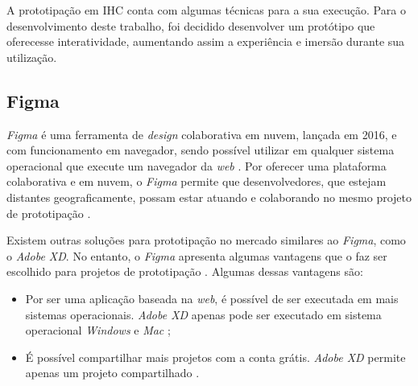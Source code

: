 A prototipação em IHC conta com algumas técnicas para a sua execução. Para o desenvolvimento deste trabalho, foi decidido desenvolver um protótipo que oferecesse interatividade, aumentando assim a experiência e imersão durante sua utilização.

\subsection{Figma}

\textit{Figma} é uma ferramenta de \textit{design} colaborativa em nuvem, lançada em 2016, e com funcionamento em navegador, sendo possível utilizar em qualquer sistema operacional que execute um navegador da \textit{web} \cite{nguyen}. Por oferecer uma plataforma colaborativa e em nuvem, o \textit{Figma} permite que desenvolvedores, que estejam distantes geograficamente, possam estar atuando e colaborando no mesmo projeto de prototipação \cite{nascimento}.

Existem outras soluções para prototipação no mercado similares ao \textit{Figma}, como o \textit{Adobe XD}. No entanto, o \textit{Figma} apresenta algumas vantagens que o faz ser escolhido para projetos de prototipação \cite{teplov}. Algumas dessas vantagens são:

\begin{itemize}
    \item Por ser uma aplicação baseada na \textit{web}, é possível de ser executada em mais sistemas operacionais. \textit{Adobe XD} apenas pode ser executado em sistema operacional \textit{Windows} e \textit{Mac} \cite{teplov};
    \item É possível compartilhar mais projetos com a conta grátis. \textit{Adobe XD} permite apenas um projeto compartilhado \cite{teplov}.
\end{itemize}